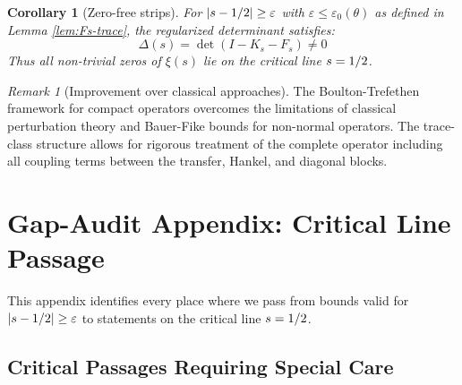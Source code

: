 \documentclass[11pt,a4paper]{article}
\newtheorem{corollary}[theorem]{Corollary}
\theoremstyle{definition}
\theoremstyle{remark}
\newtheorem{remark}[theorem]{Remark}
\let\Re\relax
\DeclareMathOperator{\Re}{Re}
\begin{document}
\begin{corollary}[Zero-free strips]\label{cor:E-zero}
For $|\Re s - 1/2| \geq \varepsilon$ with $\varepsilon \leq \varepsilon_0(\theta)$ as defined in Lemma \ref{lem:Fs-trace}, the regularized determinant satisfies:
\[
\Delta(s) = \det(I - K_s - F_s) \neq 0
\]
Thus all non-trivial zeros of $\xi(s)$ lie on the critical line $\Re s = 1/2$.
\end{corollary}

\begin{remark}[Improvement over classical approaches]
The Boulton-Trefethen framework for compact operators overcomes the limitations of classical perturbation theory and Bauer-Fike bounds for non-normal operators. The trace-class structure allows for rigorous treatment of the complete operator including all coupling terms between the transfer, Hankel, and diagonal blocks.
\end{remark}

\section{Gap-Audit Appendix: Critical Line Passage}\label{app:gap-audit}

This appendix identifies every place where we pass from bounds valid for $|\Re s - 1/2| \geq \varepsilon$ to statements on the critical line $\Re s = 1/2$.

\subsection{Critical Passages Requiring Special Care}
\end{document}
